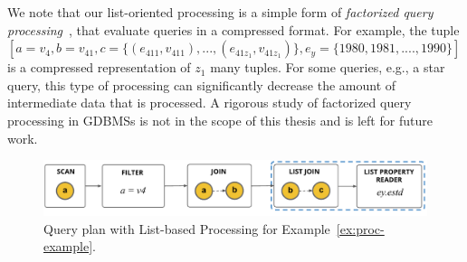 We note that our list-oriented processing is a simple form of {\em factorized query processing}~\cite{olteanu}, that evaluate queries in a compressed format. For example, the tuple  $[a=v_4, b=v_{41}, c=\{(e_{411}, v_{411}), ..., (e_{41z_1}, v_{41z_1})\}, e_y=\{1980, 1981, ...., 1990\}]$ is a compressed representation of $z_1$ many tuples. For some queries, e.g., a star query, this type of processing can significantly decrease the amount of intermediate data that is processed. A rigorous study of factorized query processing in GDBMSs is not in the scope of this thesis and is left for future work.

\begin{figure}
	\hfill\includegraphics[scale=0.78]{img/proc-lbqp}\hfill
	\vspace{-10pt}
	\caption{Query plan with List-based Processing for Example~\ref{ex:proc-example}.}
	\vspace{-8pt}
	\label{fig:proc-lbqp}
\end{figure}










